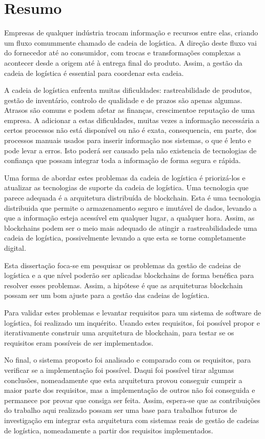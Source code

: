 \chapter{Resumo}
Empresas de qualquer indústria trocam informação e recursos entre elas, criando um fluxo comummente chamado de cadeia de logística. A direção deste fluxo vai do fornecedor até ao consumidor, com trocas e transformações complexas a acontecer desde a origem até à entrega final do produto. Assim, a gestão da cadeia de logística é essential para coordenar esta cadeia.

A cadeia de logística enfrenta muitas dificuldades: rastreabilidade de produtos, gestão de inventário, controlo de qualidade e de prazos são apenas algumas. Atrasos são comuns e podem afetar as finanças, crescimentoe reputação de uma empresa. A adicionar a estas dificuldades, muitas vezes a informação necessária a certos processos não está disponível ou não é exata, consequencia, em parte, dos processos manuais usados para inserir informação nos sistemas, o que é lento e pode levar a erros. Isto poderá ser causado pela não existencia de tecnologias de confiança que possam integrar toda a informação de forma segura e rápida.

Uma forma de abordar estes problemas da cadeia de logística é priorizá-los e atualizar as tecnologias de suporte da cadeia de logística. Uma tecnologia que parece adequada é a arquitetura distribuída de blockchain. Esta é uma tecnologia distribuida que permite o armazenamento seguro e imutável de dados, levando a que a informação esteja acessível em qualquer lugar, a qualquer hora. Assim, as blockchains podem ser o meio mais adequado de atingir a rastreabilidadede uma cadeia de logística, possivelmente levando a que esta se torne completamente digital.

Esta dissertação foca-se em pesquisar os problemas da gestão de cadeias de logística e a que nível poderão ser aplicadas blockchains de forma benéfica para resolver esses problemas. Assim, a hipótese é que as arquiteturas blockchain possam ser um bom ajuste para a gestão das cadeias de logística.

Para validar estes problemas e levantar requisitos para um sistema de software de logística, foi realizado um inquérito. Usando estes requisitos, foi possível propor e iterativamente construir uma arquitetura de blockchain, para testar se os requisitos eram possíveis de ser implementados.

No final, o sistema proposto foi analisado e comparado com os requisitos, para verificar se a implementação foi possível. Daqui foi possível tirar algumas conclusões, nomeadamente que esta arquitetura provou conseguir cumprir a maior parte dos requisitos, mas a implementação de outros não foi conseguida e permanece por provar que consiga ser feita. Assim, espera-se que as contribuições do trabalho aqui realizado possam ser uma base para trabalhos futuros de investigação em integrar esta arquitetura com sistemas reais de gestão de cadeias de logística, nomeadamente a partir dos requisitos implementados.





